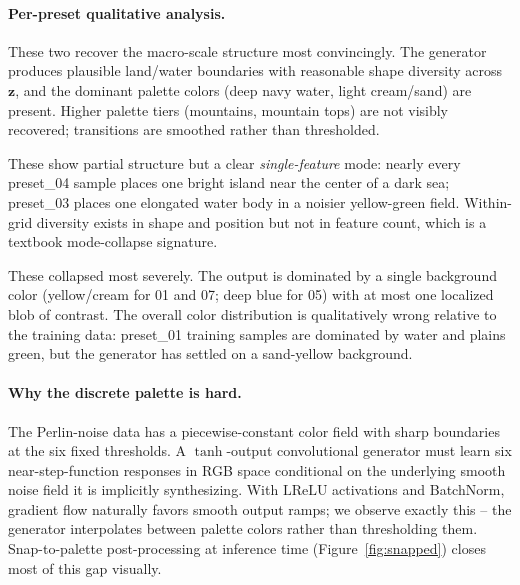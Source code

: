 \documentclass[11pt]{article}
\begin{document}
\paragraph{Per-preset qualitative analysis.}
\begin{description}[leftmargin=1.5em, style=nextline, itemsep=2pt]
  \item[preset\_02, preset\_06] These two recover the macro-scale structure
    most convincingly. The generator produces plausible land/water boundaries
    with reasonable shape diversity across $\mathbf{z}$, and the dominant
    palette colors (deep navy water, light cream/sand) are present. Higher
    palette tiers (mountains, mountain tops) are not visibly recovered;
    transitions are smoothed rather than thresholded.
  \item[preset\_03, preset\_04] These show partial structure but a clear
    \emph{single-feature} mode: nearly every preset\_04 sample places one
    bright island near the center of a dark sea; preset\_03 places one
    elongated water body in a noisier yellow-green field. Within-grid
    diversity exists in shape and position but not in feature count, which is
    a textbook mode-collapse signature.
  \item[preset\_01, preset\_05, preset\_07] These collapsed most severely.
    The output is dominated by a single background color (yellow/cream for
    01 and 07; deep blue for 05) with at most one localized blob of contrast.
    The overall color distribution is qualitatively wrong relative to the
    training data: preset\_01 training samples are dominated by water and
    plains green, but the generator has settled on a sand-yellow background.
\end{description}

\paragraph{Why the discrete palette is hard.}
The Perlin-noise data has a piecewise-constant color field with sharp
boundaries at the six fixed thresholds. A $\tanh$-output convolutional
generator must learn six near-step-function responses in RGB space conditional
on the underlying smooth noise field it is implicitly synthesizing. With
$\mathrm{LReLU}$ activations and BatchNorm, gradient flow naturally favors
smooth output ramps; we observe exactly this -- the generator interpolates
between palette colors rather than thresholding them. Snap-to-palette
post-processing at inference time (Figure~\ref{fig:snapped}) closes most of
this gap visually.
\end{document}

